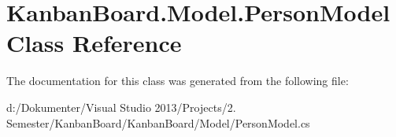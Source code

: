 \hypertarget{class_kanban_board_1_1_model_1_1_person_model}{}\section{Kanban\+Board.\+Model.\+Person\+Model Class Reference}
\label{class_kanban_board_1_1_model_1_1_person_model}


The documentation for this class was generated from the following file\+:\begin{DoxyCompactItemize}
\item 
d\+:/\+Dokumenter/\+Visual Studio 2013/\+Projects/2. Semester/\+Kanban\+Board/\+Kanban\+Board/\+Model/Person\+Model.\+cs\end{DoxyCompactItemize}
